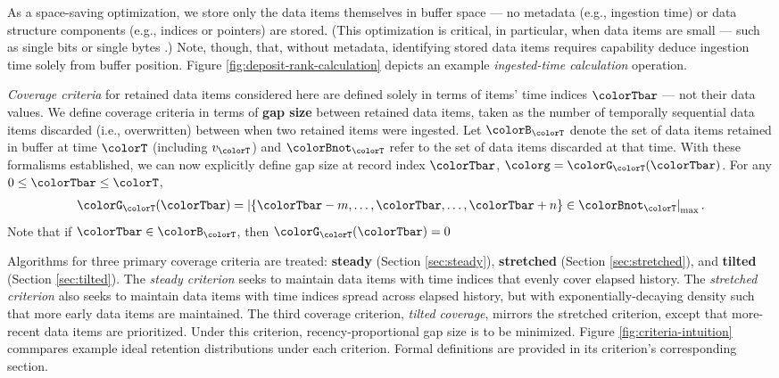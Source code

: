 As a space-saving optimization, we store only the data items themselves in buffer space --- no metadata (e.g., ingestion time) or data structure components (e.g., indices or pointers) are stored.
(This optimization is critical, in particular, when data items are small --- such as single bits or single bytes \citep{moreno2022hereditary}.)
Note, though, that, without metadata, identifying stored data items requires capability deduce ingestion time solely from buffer position.
Figure \ref{fig:deposit-rank-calculation} depicts an example \textit{ingested-time calculation} operation.

\textit{Coverage criteria} for retained data items considered here are defined solely in terms of items' time indices $\colorTbar$ --- not their data values.
We define coverage criteria in terms of \textbf{gap size} between retained data items, taken as the number of temporally sequential data items discarded (i.e., overwritten) between when two retained items were ingested.
Let $\colorB_{\colorT}$ denote the set of data items retained in buffer at time $\colorT$ (including $v_{\colorT}$) and $\colorBnot_{\colorT}$ refer to the set of data items discarded at that time.
With these formalisms established, we can now explicitly define gap size at record index $\colorTbar$, $\colorg = \colorG_{\colorT}(\colorTbar)$.
For any $0 \leq \colorTbar \leq \colorT$,
\begin{align*}
\colorG_{\colorT}(\colorTbar) = \left| \{\colorTbar - m, \ldots, \colorTbar, \ldots, \colorTbar+n\} \in \colorBnot_{\colorT} \right|_\mathrm{max}.
\end{align*}
Note that if $\colorTbar \in \colorB_{\colorT}$, then $\colorG_{\colorT}(\colorTbar) = 0$

Algorithms for three primary coverage criteria are treated: \textbf{steady} (Section \ref{sec:steady}), \textbf{stretched} (Section \ref{sec:stretched}), and \textbf{tilted} (Section \ref{sec:tilted}).
The \textit{steady criterion} seeks to maintain data items with time indices that evenly cover elapsed history.
The \textit{stretched criterion} also seeks to maintain data items with time indices spread across elapsed history, but with exponentially-decaying density such that more early data items are maintained.
The third coverage criterion, \textit{tilted coverage}, mirrors the stretched criterion, except that more-recent data items are prioritized.
Under this criterion, recency-proportional gap size is to be minimized.
Figure \ref{fig:criteria-intuition} commpares example ideal retention distributions under each criterion.
Formal definitions are provided in its criterion's corresponding section.

